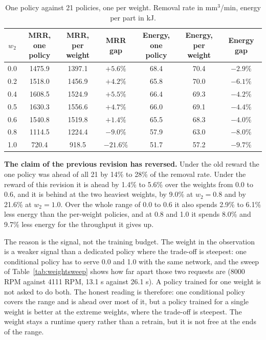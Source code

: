 \documentclass[11pt,a4paper]{article}
\begin{document}
\begin{table}[H]
\centering
\caption{One policy against 21 policies, one per weight. Removal rate in mm$^3$/min, energy per part in kJ.}
\label{tab:conditioned}
\begin{tabular}{@{}ccccccc@{}}
\toprule
$w_2$ & \makecell{MRR, one\\policy} & \makecell{MRR, per\\weight} & MRR gap & \makecell{Energy, one\\policy} & \makecell{Energy, per\\weight} & Energy gap \\
\midrule
0.0 & 1475.9 & 1397.1 & $+5.6\%$ & 68.4 & 70.4 & $-2.9\%$ \\
0.2 & 1518.0 & 1456.9 & $+4.2\%$ & 65.8 & 70.0 & $-6.1\%$ \\
0.4 & 1608.5 & 1524.9 & $+5.5\%$ & 66.4 & 69.3 & $-4.2\%$ \\
0.5 & 1630.3 & 1556.6 & $+4.7\%$ & 66.0 & 69.1 & $-4.4\%$ \\
0.6 & 1540.8 & 1519.8 & $+1.4\%$ & 65.5 & 68.3 & $-4.0\%$ \\
0.8 & 1114.5 & 1224.4 & $-9.0\%$ & 57.9 & 63.0 & $-8.0\%$ \\
1.0 & 720.4 & 918.5 & $-21.6\%$ & 51.7 & 57.2 & $-9.7\%$ \\
\bottomrule
\end{tabular}
\end{table}

\textbf{The claim of the previous revision has reversed.} Under the old reward the one policy was ahead of all 21 by 14\% to 28\% of the removal rate. Under the reward of this revision it is ahead by 1.4\% to 5.6\% over the weights from 0.0 to 0.6, and it is behind at the two heaviest weights, by 9.0\% at $w_2 = 0.8$ and by 21.6\% at $w_2 = 1.0$. Over the whole range of 0.0 to 0.6 it also spends 2.9\% to 6.1\% less energy than the per-weight policies, and at 0.8 and 1.0 it spends 8.0\% and 9.7\% less energy for the throughput it gives up.

The reason is the signal, not the training budget. The weight in the observation is a weaker signal than a dedicated policy where the trade-off is steepest: one conditional policy has to serve 0.0 and 1.0 with the same network, and the sweep of Table~\ref{tab:weightsweep} shows how far apart those two requests are (8000 RPM against 4111 RPM, 13.1 s against 26.1 s). A policy trained for one weight is not asked to do both. The honest reading is therefore: one conditional policy covers the range and is ahead over most of it, but a policy trained for a single weight is better at the extreme weights, where the trade-off is steepest. The weight stays a runtime query rather than a retrain, but it is not free at the ends of the range.
\end{document}
